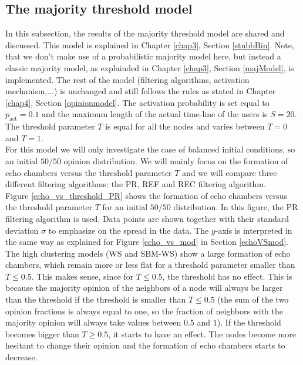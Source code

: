 \documentclass[11 pt , letterpaper , twoside , openright]{book}
\begin{document}
\subsection{The majority threshold model}
\label{majThres}

In this subsection, the results of the majority threshold model are shared and discussed. This model is explained in Chapter \ref{chap3}, Section \ref{stubbBin}. Note, that we don't make use of a probabilistic majority model here, but instead a classic majority model, as explainded in Chapter \ref{chap3}, Section \ref{majModel}, is implemented. The rest of the model (filtering algorithms, activation mechanism,...) is unchanged and still follows the rules as stated in Chapter \ref{chap4}, Section \ref{opinionmodel}. The activation probability is set equal to $p_{\text{act}} = 0.1$ and the maximum length of the actual time-line of the users is $S=20$. The threshold parameter $T$ is equal for all the nodes and varies between $T=0$ and $T=1$.\\
For this model we will only investigate the case of balanced initial conditions, so an initial $50/50$ opinion distribution. We will mainly focus on the formation of echo chambers versus the threshold parameter $T$ and we will compare three different filtering algorithms: the PR, REF and REC filtering algorithm. \\
\newline
Figure \ref{echo_vs_threshold_PR} shows the formation of echo chambers versus the threshold parameter $T$ for an initial $50/50$ distribution. In this figure, the PR filtering algorithm is used. Data points are shown together with their standard deviation $\sigma$ to emphasize on the spread in the data. The $y$-axis is interpreted in the same way as explained for Figure \ref{echo_vs_mod} in Section \ref{echoVSmod}.\\
The high clustering models (WS and SBM-WS) show a large formation of echo chambers, which remain more or less flat for a threshold parameter smaller than $T \leqslant 0.5$. This makes sense, since for $T \leqslant 0.5$, the threshold has no effect. This is because the majority opinion of the neighbors of a node will always be larger than the threshold if the threshold is smaller than $T \leqslant 0.5$ (the sum of the two opinion fractions is always equal to one, so the fraction of neighbors with the majority opinion will always take values between $0.5$ and $1$). If the threshold becomes bigger than $T \geqslant 0.5$, it starts to have an effect. The nodes become more hesitant to change their opinion and the formation of echo chambers starts to decrease.\\
\end{document}
